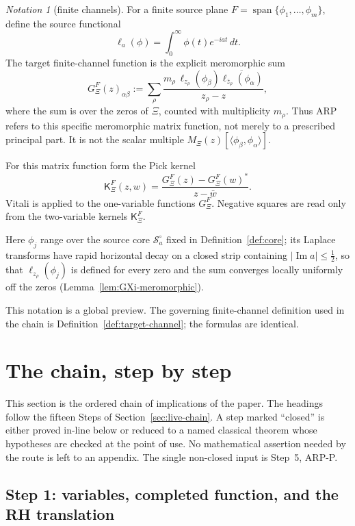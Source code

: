 \documentclass[11pt]{amsart}
\theoremstyle{definition}
\theoremstyle{remark}
\newtheorem{notation}[theorem]{Notation}
\theoremstyle{definition}
\renewcommand{\Im}{\operatorname{Im}}
\newcommand{\half}{\tfrac{1}{2}}
\newcommand{\cS}{\mathcal{S}}
\newcommand{\GXi}{G_\Xi}
\newcommand{\KXi}{\mathsf{K}_\Xi}
\begin{document}
\begin{notation}[finite channels]\label{not:channels}
For a finite source plane $F=\operatorname{span}\{\phi_1,\ldots,\phi_m\}$, define the source functional
\[
   \ell_a(\phi)=\int_0^\infty \phi(t)e^{-iat}\,dt.
\]
The target finite-channel function is the explicit meromorphic sum
\begin{equation}\label{eq:GXiF}
   \GXi^F(z)_{\alpha\beta}
   :=
   \sum_\rho
   \frac{
      m_\rho\,\ell_{z_\rho}(\phi_\beta)\overline{\ell_{\bar z_\rho}(\phi_\alpha)}
   }{z_\rho-z},
\end{equation}
where the sum is over the zeros of $\Xi$, counted with multiplicity $m_\rho$.  Thus ARP refers to this
specific meromorphic matrix function, not merely to a prescribed principal part.  It is not the scalar
multiple $M_\Xi(z)[\langle\phi_\beta,\phi_\alpha\rangle]$.

For this matrix function form the Pick kernel
\[
   \KXi^F(z,w)=\frac{\GXi^F(z)-\GXi^F(w)^*}{z-\bar w}.
\]
Vitali is applied to the one-variable functions $\GXi^F$.  Negative squares are read only from the
two-variable kernels $\KXi^F$.

Here $\phi_j$ range over the source core $\cS_a^\circ$ fixed in Definition~\ref{def:core}; its
Laplace transforms have rapid horizontal decay on a closed strip containing $|\Im a|\le\half$, so that
$\ell_{z_\rho}(\phi_j)$ is defined for every zero and the sum converges locally uniformly off the zeros
(Lemma~\ref{lem:GXi-meromorphic}).

This notation is a global preview.  The governing finite-channel definition used in the chain is
Definition~\ref{def:target-channel}; the formulas are identical.
\end{notation}

\section{The chain, step by step}\label{sec:live-proof-steps}

This section is the ordered chain of implications of the paper.  The headings follow the fifteen Steps of
Section~\ref{sec:live-chain}.  A step marked ``closed'' is either proved in-line below or reduced to a
named classical theorem whose hypotheses are checked at the point of use.  No mathematical assertion
needed by the route is left to an appendix.  The single non-closed input is Step~5, ARP-P.

\subsection{Step 1: variables, completed function, and the RH translation}
\end{document}
